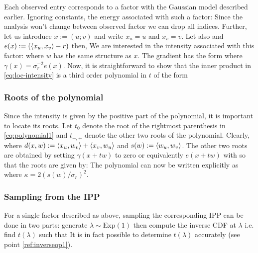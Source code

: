 Each observed entry corresponds to a factor with the Gaussian model described earlier. Ignoring constants, the energy associated with such a factor:
%
%
Since the analysis won't change between observed factor we can drop all indices. Further, let us introduce $x:=(u; v)$ and write $x_{u}=u$ and $x_{v}=v$. Let also and $e(x):=(\left\langle x_{u},x_{v} \right\rangle-r)$ then, 
We are interested in the intensity associated with this factor:
%
%
where $w$ has the same structure as $x$. The gradient has the form
where $\gamma(x)=\sigma^{-2}_{r}e(x)$. Now, it is straightforward to show that the inner product in \eqref{eq:loc-intensity} is a third order polynomial in $t$ of the form
%
\subsubsection{Roots of the polynomial}
Since the intensity is given by the positive part of the polynomial, it is important to locate its roots. Let $t_{0}$ denote the root of the rightmost parenthesis in \eqref{eq:polynomial1} and $t_{-,+}$ denote the other two roots of the polynomial. Clearly,
%
%
where $d(x,w):=\left\langle x_{u},w_{v} \right\rangle+\left\langle x_{v},w_{u} \right\rangle$ and $s(w):=\left\langle w_{u},w_{v} \right\rangle$. The other two roots are obtained by setting $\gamma(x+tw)$ to zero or equivalently $e(x+tw)$ with
%
%
so that the roots are given by:
%
%
The polynomial can now be written explicitly as
%
%
where $\kappa=2(s(w)/\sigma_{r})^{2}$.
\subsubsection{Sampling from the IPP}
For a single factor described as above, sampling the corresponding IPP can be done in two parts: generate $\lambda\sim \mathrm{Exp}(1)$ then compute the inverse CDF at $\lambda$ i.e. find $t(\lambda)$ such that
%
%
It is in fact possible to determine $t(\lambda)$ accurately (see point \ref{ref:inverseop1}).

